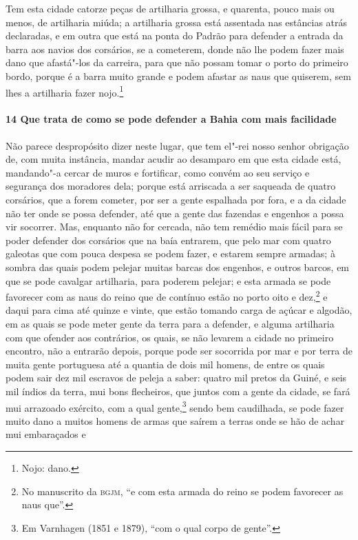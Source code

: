 \begin{linenumbers}
Tem esta cidade catorze peças de artilharia grossa, e quarenta, pouco mais ou menos, de
artilharia miúda; a artilharia grossa está assentada nas estâncias atrás declaradas, e em
outra que está na ponta do Padrão para defender a entrada da barra aos navios dos
corsários, se a cometerem, donde não lhe podem fazer mais dano que afastá"-los da carreira,
para que não possam tomar o porto do primeiro bordo, porque é a barra muito grande e podem
afastar as naus que quiserem, sem lhes a artilharia fazer nojo.\footnote{ Nojo: dano.}


\paragraph{14 Que trata de como se pode defender a Bahia com mais facilidade} \quad
Não parece despropósito dizer neste lugar, que tem el"-rei nosso senhor obrigação de, com
muita instância, mandar acudir ao desamparo em que esta cidade está, mandando"-a cercar de
muros e fortificar, como convém ao seu serviço e segurança dos moradores dela; porque está
arriscada a ser saqueada de quatro corsários, que a forem cometer, por ser a gente
espalhada por fora, e a da cidade não ter onde se possa defender, até que a gente das
fazendas e engenhos a possa vir socorrer. Mas, enquanto não for cercada, não tem remédio
mais fácil para se poder defender dos corsários que na baía entrarem, que pelo mar com
quatro galeotas que com pouca despesa se podem fazer, e estarem sempre armadas; à sombra
das quais podem pelejar muitas barcas dos engenhos, e outros barcos, em que se pode
cavalgar artilharia, para poderem pelejar; e esta armada se pode favorecer com as naus do
reino que de contínuo estão no porto oito e dez,\footnote{ No manuscrito da \textsc{bgjm},
``e com esta armada do reino se podem favorecer as naus que''.} e daqui para cima até
quinze e vinte, que estão tomando carga de açúcar e algodão, em as quais se pode meter
gente da terra para a defender, e alguma artilharia com que ofender aos contrários, os
quais, se não levarem a cidade no primeiro encontro, não a entrarão depois, porque pode
ser socorrida por mar e por terra de muita gente portuguesa até a quantia de dois mil
homens, de entre os quais podem sair dez mil escravos de peleja a saber: quatro mil pretos
da Guiné, e seis mil índios da terra, mui bons flecheiros, que juntos com a gente da
cidade, se fará mui arrazoado exército, com a qual gente,\footnote{ Em Varnhagen (1851 e
1879), ``com o qual corpo de gente''.} sendo bem caudilhada, se pode fazer muito dano a
muitos homens de armas que saírem a terras onde se hão de achar mui embaraçados e

\end{linenumbers}
